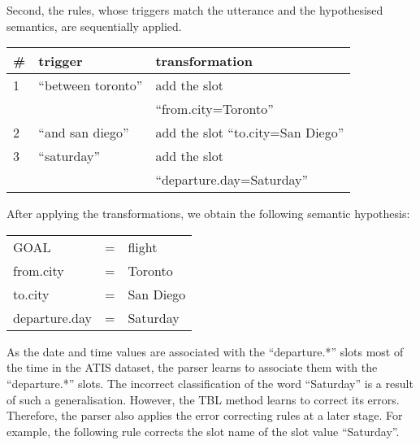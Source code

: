 \documentclass{article}
\begin{document}
Second, the rules, whose triggers match the utterance and the hypothesised semantics, are sequentially applied. 

\vspace{.15cm}
\begin{tabular}{lll}
  \# & trigger & transformation \\
  \hline 
  1 & ``between toronto''     & add the slot \\ 
    &                         & ``from.city=Toronto'' \\
  2 & ``and san diego''       & add the slot ``to.city=San Diego'' \\
  3 & ``saturday''            & add the slot \\
    &                         &   ``departure.day=Saturday'' \\
\end{tabular} 
\vspace{.15cm}

After applying the transformations, we obtain the following semantic hypothesis: 

\vspace{.15cm}
\begin{tabular}{lll}
  GOAL          & = & flight \\
  from.city     & = & Toronto \\
  to.city       & = & San Diego \\
  departure.day & = & Saturday \\
\end{tabular} 
\vspace{.15cm}



As the date and time values are associated with the ``departure.*'' slots most of the time in the ATIS dataset,  
the parser learns to associate them with the ``departure.*'' slots. The incorrect classification of the word ``Saturday'' is a result of such a generalisation. 
However, the TBL method learns to correct its errors. Therefore, the parser also applies the error correcting rules at a later stage. For example, the following rule corrects the slot name of the slot value ``Saturday''.
\end{document}
